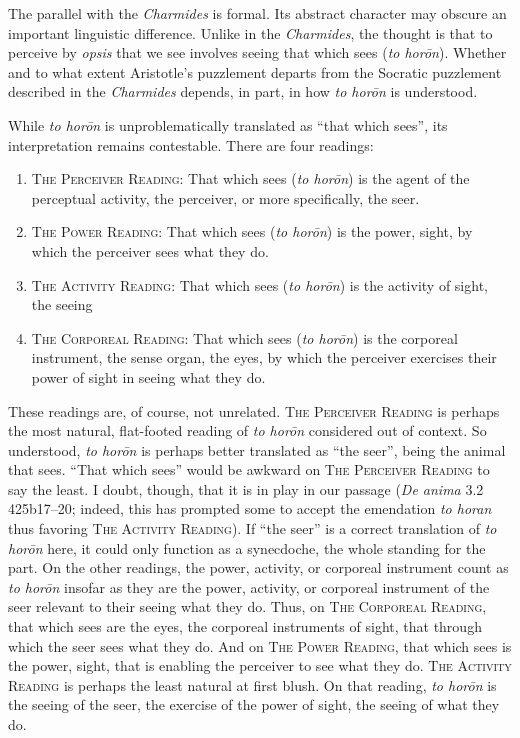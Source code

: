 The parallel with the \emph{Charmides} is formal. Its abstract character may obscure an important linguistic difference. Unlike in the \emph{Charmides}, the thought is that to perceive by \emph{opsis} that we see involves seeing that which sees (\emph{to horōn}). Whether and to what extent Aristotle's puzzlement departs from the Socratic puzzlement described in the \emph{Charmides} depends, in part, in how \emph{to horōn} is understood.

While \emph{to horōn} is unproblematically translated as ``that which sees'', its interpretation remains contestable. There are four readings:
\begin{enumerate}[(1)]
	\item \textsc{The Perceiver Reading}: That which sees (\emph{to horōn}) is the agent of the perceptual activity, the perceiver, or more specifically, the seer.
	\item \textsc{The Power Reading}: That which sees (\emph{to horōn}) is the power, sight, by which the perceiver sees what they do.
	\item \textsc{The Activity Reading}: That which sees (\emph{to horōn}) is the activity of sight, the seeing
	\item \textsc{The Corporeal Reading}: That which sees (\emph{to horōn}) is the corporeal instrument, the sense organ, the eyes, by which the perceiver exercises their power of sight in seeing what they do.
\end{enumerate}

These readings are, of course, not unrelated. \textsc{The Perceiver Reading} is perhaps the most natural, flat-footed reading of \emph{to horōn} considered out of context. So understood, \emph{to horōn} is perhaps better translated as ``the seer'', being the animal that sees. ``That which sees'' would be awkward on \textsc{The Perceiver Reading} to say the least. I doubt, though, that it is in play in our passage (\emph{De anima} 3.2 425b17–20; indeed, this has prompted some to accept the emendation \emph{to horan} thus favoring \textsc{The Activity Reading}). If ``the seer'' is a correct translation of \emph{to horōn} here, it could only function as a synecdoche, the whole standing for the part. On the other readings, the power, activity, or corporeal instrument count as \emph{to horōn} insofar as they are the power, activity, or corporeal instrument of the seer relevant to their seeing what they do. Thus, on \textsc{The Corporeal Reading}, that which sees are the eyes, the corporeal instruments of sight, that through which the seer sees what they do. And on \textsc{The Power Reading}, that which sees is the power, sight, that is enabling the perceiver to see what they do. \textsc{The Activity Reading} is perhaps the least natural at first blush. On that reading, \emph{to horōn} is the seeing of the seer, the exercise of the power of sight, the seeing of what they do. 

